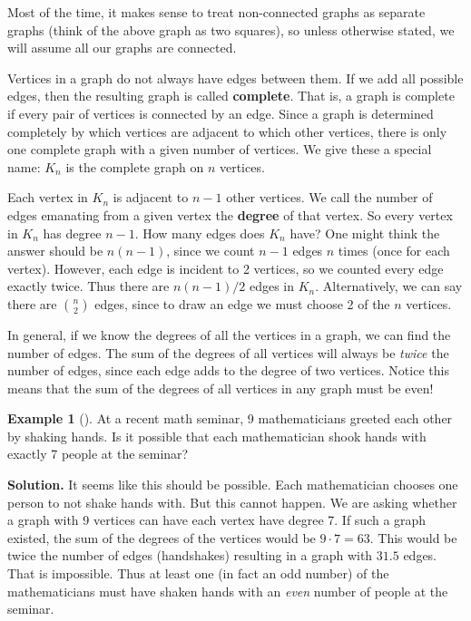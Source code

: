 \documentclass[12pt,]{book}
\newcommand{\terminology}[1]{\textbf{#1}}
\theoremstyle{plain}
\theoremstyle{definition}
\theoremstyle{definition}
\newtheorem{example}[theorem]{Example}
\theoremstyle{definition}
\numberwithin{equation}{chapter}
\begin{document}
\par
\hypertarget{p-1553}{}%
Most of the time, it makes sense to treat non-connected graphs as separate graphs (think of the above graph as two squares), so unless otherwise stated, we will assume all our graphs are connected.%
\par
\hypertarget{p-1554}{}%
Vertices in a graph do not always have edges between them. If we add all possible edges, then the resulting graph is called \terminology{complete}. That is, a graph is complete if every pair of vertices is connected by an edge. Since a graph is determined completely by which vertices are adjacent to which other vertices, there is only one complete graph with a given number of vertices. We give these a special name: \(K_n\)\label{notation-33}
 is the complete graph on \(n\) vertices.%
\par
\hypertarget{p-1555}{}%
Each vertex in \(K_n\) is adjacent to \(n-1\) other vertices. We call the number of edges emanating from a given vertex the \terminology{degree} of that vertex. So every vertex in \(K_n\) has degree \(n-1\). How many edges does \(K_n\) have? One might think the answer should be \(n(n-1)\), since we count \(n-1\) edges \(n\) times (once for each vertex). However, each edge is incident to 2 vertices, so we counted every edge exactly twice. Thus there are \(n(n-1)/2\) edges in \(K_n\). Alternatively, we can say there are \({n \choose 2}\) edges, since to draw an edge we must choose 2 of the \(n\) vertices.%
\par
\hypertarget{p-1556}{}%
In general, if we know the degrees of all the vertices in a graph, we can find the number of edges. The sum of the degrees of all vertices will always be \emph{twice} the number of edges, since each edge adds to the degree of two vertices. Notice this means that the sum of the degrees of all vertices in any graph must be even!%
\begin{example}[]\label{example-79}
\hypertarget{p-1557}{}%
At a recent math seminar, 9 mathematicians greeted each other by shaking hands. Is it possible that each mathematician shook hands with exactly 7 people at the seminar?%
\par\smallskip%
\noindent\textbf{Solution.}\hypertarget{solution-161}{}\quad%
\hypertarget{p-1558}{}%
It seems like this should be possible. Each mathematician chooses one person to not shake hands with. But this cannot happen. We are asking whether a graph with 9 vertices can have each vertex have degree 7. If such a graph existed, the sum of the degrees of the vertices would be \(9\cdot 7 = 63\). This would be twice the number of edges (handshakes) resulting in a graph with \(31.5\) edges. That is impossible. Thus at least one (in fact an odd number) of the mathematicians must have shaken hands with an \emph{even} number of people at the seminar.%
\end{example}
\end{document}
